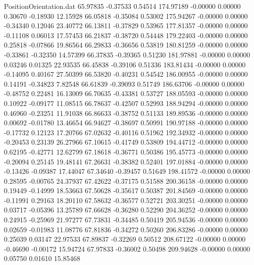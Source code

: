 \begin{filecontents}{PositionOrientation.dat}
  65.97835   -0.37533    0.54514   174.97189   -0.00000    0.00000    0.30670   -0.18930   12.15928
  66.05818   -0.35084    0.53002   175.94267   -0.00000    0.00000   -0.34340    0.12046   23.40772
  66.13811   -0.37829    0.53965   177.81357   -0.00000    0.00000   -0.11108    0.06013   17.57453
  66.21837   -0.38720    0.54448   179.22403   -0.00000    0.00000    0.25818   -0.07866   19.86564
  66.29833   -0.36656    0.53819   180.81259   -0.00000    0.00000   -0.33861   -0.32350   14.57399
  66.37835   -0.39365    0.51230   181.97881   -0.00000    0.00000    0.03246    0.01325   22.93535
  66.45838   -0.39106    0.51336   183.81434   -0.00000    0.00000   -0.14095    0.40167   27.50399
  66.53820   -0.40231    0.54542   186.00955   -0.00000    0.00000    0.14191   -0.34823    7.82548
  66.61839   -0.39093    0.51749   186.63706   -0.00000    0.00000   -0.48752    0.22481   16.13009
  66.70635   -0.43381    0.53727   188.05593   -0.00000    0.00000    0.10922   -0.09177   11.08515
  66.78637   -0.42507    0.52993   188.94294   -0.00000    0.00000    0.46960   -0.23251   11.91038
  66.86633   -0.38752    0.51133   189.89536   -0.00000    0.00000    0.00692   -0.01780   13.46654
  66.94627   -0.38697    0.50991   190.97188   -0.00000    0.00000   -0.17732    0.12123   17.20766
  67.02632   -0.40116    0.51962   192.34932   -0.00000    0.00000   -0.20453    0.23139   26.27966
  67.10615   -0.41749    0.53809   194.44712   -0.00000    0.00000    0.62195   -0.42771   12.62799
  67.18618   -0.36771    0.50386   195.45773   -0.00000    0.00000   -0.20094    0.25145   19.48141
  67.26631   -0.38382    0.52401   197.01884   -0.00000    0.00000   -0.13426   -0.09387   17.44047
  67.34640   -0.39457    0.51649   198.41572   -0.00000    0.00000    0.28595   -0.00765   24.37937
  67.42622   -0.37175    0.51588   200.36158   -0.00000    0.00000    0.19449   -0.14999   18.53663
  67.50628   -0.35617    0.50387   201.84569   -0.00000    0.00000   -0.11991    0.29163   18.20110
  67.58632   -0.36577    0.52721   203.30251   -0.00000    0.00000    0.03717   -0.05396   13.25789
  67.66628   -0.36280    0.52290   204.36252   -0.00000    0.00000    0.24915   -0.25969   21.97277
  67.73831   -0.34485    0.50419   205.94536   -0.00000    0.00000    0.02659   -0.01983   11.08776
  67.81836   -0.34272    0.50260   206.83286   -0.00000    0.00000    0.25039    0.03147   22.97533
  67.89837   -0.32269    0.50512   208.67122   -0.00000    0.00000   -0.46690   -0.00172   15.94724
  67.97833   -0.36002    0.50498   209.94628   -0.00000    0.00000    0.05750    0.01610   15.85468

\end{filecontents}
